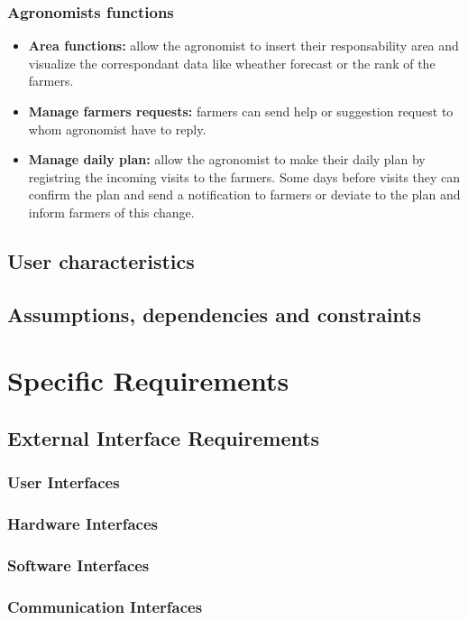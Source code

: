 \documentclass[table, 12pt]{article}
\begin{document}
\subsubsection{Agronomists functions}
\begin{itemize}
    \item \textbf{Area functions: }allow the agronomist to insert their responsability area and visualize the correspondant data like wheather forecast or the rank of the farmers.
    \item \textbf{Manage farmers requests: }farmers can send help or suggestion request to whom agronomist have to reply.
    \item \textbf{Manage daily plan: }allow the agronomist to make their daily plan by registring the incoming visits to the farmers. Some days before visits they can confirm the plan and send a notification to farmers or deviate to the plan and inform farmers of this change.   
\end{itemize}

\subsection{User characteristics}
\subsection{Assumptions, dependencies and constraints}

\section{Specific Requirements}
\subsection{External Interface Requirements}
\subsubsection{User Interfaces}
\subsubsection{Hardware Interfaces}
\subsubsection{Software Interfaces}
\subsubsection{Communication Interfaces}
\end{document}
